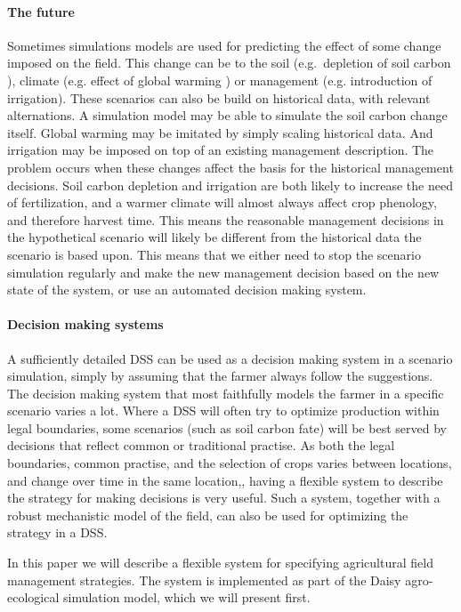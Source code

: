 \documentclass[a4paper]{article}
\begin{document}
\paragraph{The future} Sometimes simulations models are used for
predicting the effect of some change imposed on the field.  This
change can be to the soil (e.g.\ depletion of soil carbon
\cite{daisy-somnew}), climate (e.g. effect of global warming
\cite{climate}) or management (e.g.  introduction of irrigation).
These scenarios can also be build on historical data, with relevant
alternations.  A simulation model may be able to simulate the soil
carbon change itself.  Global warming may be imitated by simply
scaling historical data.  And irrigation may be imposed on top of an
existing management description.  The problem occurs when these
changes affect the basis for the historical management decisions.
Soil carbon depletion and irrigation are both likely to increase the
need of fertilization, and a warmer climate will almost always affect
crop phenology, and therefore harvest time.  This means the reasonable
management decisions in the hypothetical scenario will likely be
different from the historical data the scenario is based upon.  This
means that we either need to stop the scenario simulation regularly
and make the new management decision based on the new state of the
system, or use an automated decision making system.

\paragraph{Decision making systems} A sufficiently detailed DSS can be
used as a decision making system in a scenario simulation, simply by
assuming that the farmer always follow the suggestions.  The decision
making system that most faithfully models the farmer in a specific
scenario varies a lot.  Where a DSS will often try to optimize
production within legal boundaries, some scenarios (such as soil
carbon fate) will be best served by decisions that reflect common or
traditional practise.  As both the legal boundaries, common practise,
and the selection of crops varies between locations, and change over
time in the same location,, having a flexible system to describe the
strategy for making decisions is very useful.  Such a system, together
with a robust mechanistic model of the field, can also be used for
optimizing the strategy in a DSS.

In this paper we will describe a flexible system for specifying
agricultural field management strategies.  The system is implemented
as part of the Daisy agro-ecological simulation model, which we will
present first.
\end{document}
